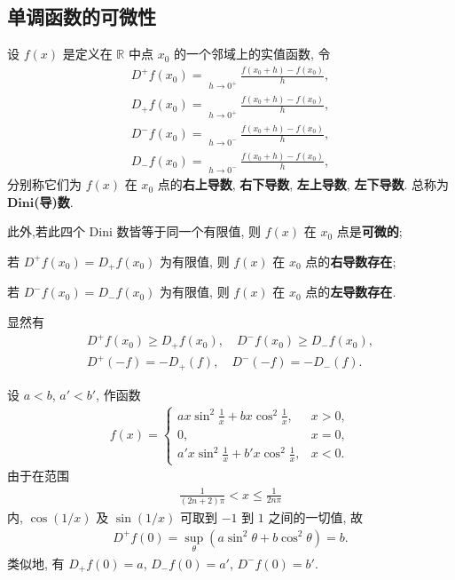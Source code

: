 \documentclass[../../main.tex]{subfiles}%
\begin{document}
\subsection{单调函数的可微性}

\begin{definition}[Dini导数]
设 $f(x)$ 是定义在 $\mathbb{R}$ 中点 $x_0$ 的一个邻域上的实值函数, 令
\begin{align*}
D^+f(x_0)=\mathop {\overline{\lim }} \limits_{h\rightarrow 0^+}\frac{f(x_0+h)-f(x_0)}{h},
\\
D_+f(x_0)=\mathop {\underline{\lim }} \limits_{h\rightarrow 0^+}\frac{f(x_0+h)-f(x_0)}{h},
\\
D^-f(x_0)=\mathop {\overline{\lim }} \limits_{h\rightarrow 0^-}\frac{f(x_0+h)-f(x_0)}{h},
\\
D_-f(x_0)=\mathop {\underline{\lim }} \limits_{h\rightarrow 0^-}\frac{f(x_0+h)-f(x_0)}{h},
\end{align*}
分别称它们为 $f(x)$ 在 $x_0$ 点的\textbf{右上导数}, \textbf{右下导数}, \textbf{左上导数}, \textbf{左下导数}. 总称为$\mathbf{Dini}$\textbf{(导)数}. 

此外,若此四个 Dini 数皆等于同一个有限值, 则 $f(x)$ 在 $x_0$ 点是\textbf{可微的}; 

若 $D^+f(x_0)=D_+f(x_0)$ 为有限值, 则 $f(x)$ 在 $x_0$ 点的\textbf{右导数存在}; 

若 $D^-f(x_0)=D_-f(x_0)$ 为有限值, 则 $f(x)$ 在 $x_0$ 点的\textbf{左导数存在}.
\end{definition}
\begin{remark}
显然有
\begin{align*}
D^+f(x_0)\geqslant D_+f(x_0),\quad D^-f(x_0)\geqslant D_-f(x_0), \\
D^+(-f) = -D_+(f),\quad D^-(-f) = -D_-(f).
\end{align*}
\end{remark}

\begin{example}
设 $a<b$, $a'<b'$, 作函数
\begin{align*}
f(x) =
\begin{cases}
ax\sin^2\frac{1}{x}+bx\cos^2\frac{1}{x}, & x>0, \\
0, & x=0, \\
a'x\sin^2\frac{1}{x}+b'x\cos^2\frac{1}{x}, & x<0.
\end{cases}
\end{align*}
由于在范围
\begin{align*}
\frac{1}{(2n+2)\pi}<x\leqslant\frac{1}{2n\pi}
\end{align*}
内, $\cos(1/x)$ 及 $\sin(1/x)$ 可取到 $-1$ 到 $1$ 之间的一切值, 故
\begin{align*}
D^+f(0) = \sup_{\theta}(a\sin^2\theta+b\cos^2\theta) = b.
\end{align*}
类似地, 有 $D_+f(0)=a$, $D_-f(0)=a'$, $D^-f(0)=b'$.
\end{example}
\end{document}
